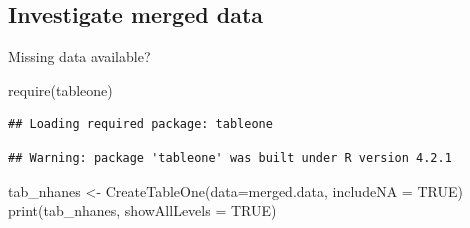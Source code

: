 \documentclass[
]{book}
\newenvironment{Shaded}{\begin{snugshade}}{\end{snugshade}}
\newcommand{\AttributeTok}[1]{\textcolor[rgb]{0.77,0.63,0.00}{#1}}
\newcommand{\ConstantTok}[1]{\textcolor[rgb]{0.00,0.00,0.00}{#1}}
\newcommand{\FunctionTok}[1]{\textcolor[rgb]{0.00,0.00,0.00}{#1}}
\newcommand{\NormalTok}[1]{#1}
\newcommand{\OtherTok}[1]{\textcolor[rgb]{0.56,0.35,0.01}{#1}}
\newcommand{\SpecialCharTok}[1]{\textcolor[rgb]{0.00,0.00,0.00}{#1}}
\begin{document}
\begin{Shaded}
\end{Shaded}

\hypertarget{investigate-merged-data}{%
\subsection{Investigate merged data}\label{investigate-merged-data}}

Missing data available?

\begin{Shaded}
\begin{Highlighting}[]
\FunctionTok{require}\NormalTok{(tableone)}
\end{Highlighting}
\end{Shaded}

\begin{verbatim}
## Loading required package: tableone
\end{verbatim}

\begin{verbatim}
## Warning: package 'tableone' was built under R version 4.2.1
\end{verbatim}

\begin{Shaded}
\begin{Highlighting}[]
\NormalTok{tab\_nhanes }\OtherTok{\textless{}{-}} \FunctionTok{CreateTableOne}\NormalTok{(}\AttributeTok{data=}\NormalTok{merged.data,}
                             \AttributeTok{includeNA =} \ConstantTok{TRUE}\NormalTok{)}
\FunctionTok{print}\NormalTok{(tab\_nhanes, }
      \AttributeTok{showAllLevels =} \ConstantTok{TRUE}\NormalTok{)}
\end{Highlighting}
\end{Shaded}
\end{document}

